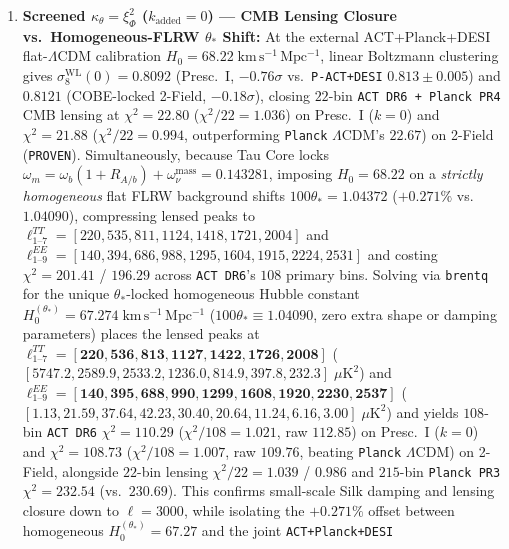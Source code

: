 \documentclass[11pt,a4paper]{article}
\begin{document}
\begin{enumerate}
  \item \textbf{Screened $\kappa_\theta = \xi_\Phi^2$ ($k_{\mathrm{added}} = 0$) — CMB Lensing Closure vs.\ Homogeneous-FLRW $\theta_*$ Shift:} At the external ACT+Planck+DESI flat-$\Lambda$CDM calibration $H_0 = 68.22\;\mathrm{km\,s^{-1}\,Mpc^{-1}}$, linear Boltzmann clustering gives $\sigma_8^{\mathrm{WL}}(0) = \mathbf{0.8092}$ (Presc.~I, $-0.76\sigma$ vs.\ {\upshape\texttt{P-ACT+DESI}} $0.813 \pm 0.005$) and $\mathbf{0.8121}$ (COBE-locked 2-Field, $-0.18\sigma$), closing $22$-bin {\upshape\texttt{ACT DR6 + Planck PR4}} CMB lensing at $\chi^2 = \mathbf{22.80}$ ($\chi^2/22 = \mathbf{1.036}$) on Presc.~I ($k=0$) and $\chi^2 = \mathbf{21.88}$ ($\chi^2/22 = \mathbf{0.994}$, outperforming \texttt{Planck} $\Lambda$CDM's $22.67$) on 2-Field ({\upshape\texttt{PROVEN}}). Simultaneously, because Tau Core locks $\omega_m = \omega_b(1 + R_{A/b}) + \omega_\nu^{\mathrm{mass}} = 0.143281$, imposing $H_0 = 68.22$ on a \emph{strictly homogeneous} flat FLRW background shifts $100\theta_* = \mathbf{1.04372}$ ($+0.271\%$ vs.\ $1.04090$), compressing lensed peaks to $\ell_{1\text{--}7}^{TT} = [220,\allowbreak 535,\allowbreak 811,\allowbreak 1124,\allowbreak 1418,\allowbreak 1721,\allowbreak 2004]$ and $\ell_{1\text{--}9}^{EE} = [140,\allowbreak 394,\allowbreak 686,\allowbreak 988,\allowbreak 1295,\allowbreak 1604,\allowbreak 1915,\allowbreak 2224,\allowbreak 2531]$ and costing $\chi^2 = 201.41$ / $196.29$ across {\upshape\texttt{ACT DR6}}'s $108$ primary bins. Solving via \texttt{brentq} for the unique $\theta_*$-locked homogeneous Hubble constant $H_0^{(\theta_*)} = \mathbf{67.274\;\mathrm{km\,s^{-1}\,Mpc^{-1}}}$ ($100\theta_* \equiv 1.04090$, zero extra shape or damping parameters) places the lensed peaks at $\ell_{1\text{--}7}^{TT} = [\mathbf{220},\allowbreak \mathbf{536},\allowbreak \mathbf{813},\allowbreak \mathbf{1127},\allowbreak \mathbf{1422},\allowbreak \mathbf{1726},\allowbreak \mathbf{2008}]$ ($[\mathbf{5747.2},\allowbreak \mathbf{2589.9},\allowbreak \mathbf{2533.2},\allowbreak \mathbf{1236.0},\allowbreak \mathbf{814.9},\allowbreak \mathbf{397.8},\allowbreak \mathbf{232.3}]\;\mu\mathrm{K}^2$) and $\ell_{1\text{--}9}^{EE} = [\mathbf{140},\allowbreak \mathbf{395},\allowbreak \mathbf{688},\allowbreak \mathbf{990},\allowbreak \mathbf{1299},\allowbreak \mathbf{1608},\allowbreak \mathbf{1920},\allowbreak \mathbf{2230},\allowbreak \mathbf{2537}]$ ($[\mathbf{1.13},\allowbreak \mathbf{21.59},\allowbreak \mathbf{37.64},\allowbreak \mathbf{42.23},\allowbreak \mathbf{30.40},\allowbreak \mathbf{20.64},\allowbreak \mathbf{11.24},\allowbreak \mathbf{6.16},\allowbreak \mathbf{3.00}]\;\mu\mathrm{K}^2$) and yields $108$-bin {\upshape\texttt{ACT DR6}} $\chi^2 = \mathbf{110.29}$ ($\chi^2/108 = \mathbf{1.021}$, raw $112.85$) on Presc.~I ($k=0$) and $\chi^2 = \mathbf{108.73}$ ($\chi^2/108 = \mathbf{1.007}$, raw $109.76$, beating \texttt{Planck} $\Lambda$CDM) on 2-Field, alongside $22$-bin lensing $\chi^2/22 = \mathbf{1.039}$ / $\mathbf{0.986}$ and $215$-bin \texttt{Planck PR3} $\chi^2 = \mathbf{232.54}$ (vs.\ $230.69$). This confirms small-scale Silk damping and lensing closure down to $\ell = 3000$, while isolating the $+0.271\%$ offset between homogeneous $H_0^{(\theta_*)} = 67.27$ and the joint \texttt{ACT+Planck+DESI} 
\end{enumerate}
\end{document}
